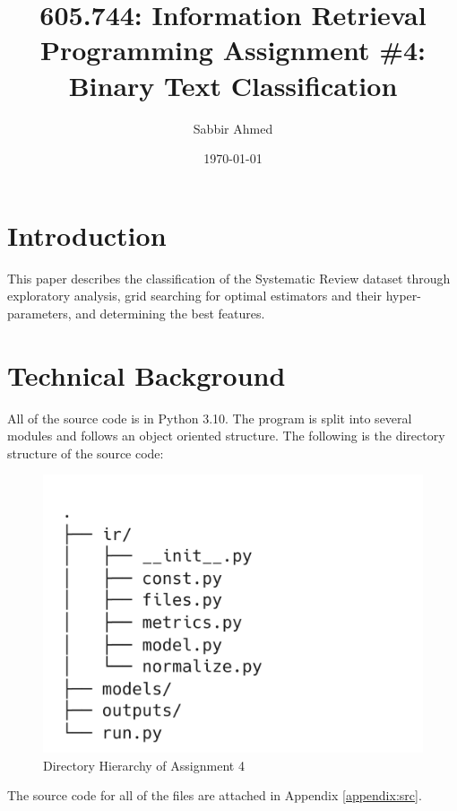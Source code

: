 \documentclass[11pt]{article}
\title{605.744: Information Retrieval \\ Programming Assignment \#4: Binary Text Classification}
\author{Sabbir Ahmed}
\date{\today}
\begin{document}
\maketitle	
\tableofcontents
\clearpage
\newpage

\section*{Introduction}
This paper describes the classification of the Systematic Review dataset through exploratory analysis, grid searching for optimal estimators and their hyper-parameters, and determining the best features.

\section*{Technical Background}
All of the source code is in Python 3.10. The program is split into several modules and follows an object oriented structure. The following is the directory structure of the source code:


\begin{figure}[!ht]
    \centering
    \includegraphics[scale=0.2]{statics/dirtree.png}
    \caption{Directory Hierarchy of Assignment 4}
\end{figure}

The source code for all of the files are attached in Appendix \ref{appendix:src}.
\end{document}
